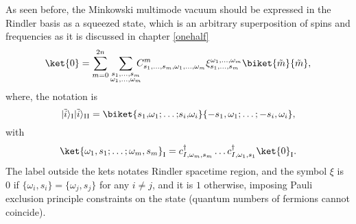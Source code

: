As seen before, the Minkowski multimode vacuum should be expressed in the Rindler basis as a squeezed state, which is an arbitrary superposition of spins and frequencies as it is discussed in chapter \ref{onehalf}
\begin{equation}
\label{vacuumCOMP}\ket{0}=\sum_{m=0}^{2n}\sum_{\substack{s_1,\dots,s_{m}\\\omega_1,\dots,\omega_{m}}}\!\!\!\!C^{m}_{s_1,\dots,s_{m},\omega_1,\dots,\omega_{m}}
\xi_{s_1,\dots,s_{m}}^{\omega_1,\dots,\omega_{m}} \biket{\tilde{m}}{\tilde{m}},
\end{equation}
where, the notation is
\begin{equation}\label{notationmod}
|{\tilde i}\rangle_\text{I}|{\tilde i}\rangle_\text{II}=\biket{s_1,\!\omega_1;\dots;\!s_i,\!\omega_i}{-s_1,\omega_1;\dots;-s_i,\omega_i},
\end{equation}
with
\begin{equation}
\ket{\omega_1,s_1;\dots;\omega_m,s_m}_\text{I}=c^\dagger_{I,\omega_m,s_m}\dots c^\dagger_{I,\omega_1,s_1}\ket{0}_\text{I}.
\end{equation}
The label outside the kets notates Rindler spacetime region, and the symbol $\xi$ is 0 if $\{\omega_i,s_i\}=\{\omega_j,s_j\}$ for any $i\neq j$, and it is $1$ otherwise, imposing Pauli exclusion principle constraints on the state (quantum numbers of fermions cannot coincide).

